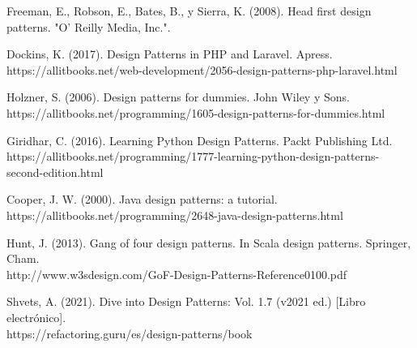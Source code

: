\documentclass{article}
\begin{document}
\begin{thebibliography}{XXX0000}
     Freeman, E., Robson, E., Bates, B., y Sierra, K. (2008). Head first design patterns. "O' Reilly Media, Inc.".

     Dockins, K. (2017). Design Patterns in PHP and Laravel. Apress. \\https://allitbooks.net/web-development/2056-design-patterns-php-laravel.html

     Holzner, S. (2006). Design patterns for dummies. John Wiley y Sons. \\https://allitbooks.net/programming/1605-design-patterns-for-dummies.html

     Giridhar, C. (2016). Learning Python Design Patterns. Packt Publishing Ltd. \\https://allitbooks.net/programming/1777-learning-python-design-patterns-second-edition.html

     Cooper, J. W. (2000). Java design patterns: a tutorial. \\https://allitbooks.net/programming/2648-java-design-patterns.html

     Hunt, J. (2013). Gang of four design patterns. In Scala design patterns. Springer, Cham. \\http://www.w3sdesign.com/GoF-Design-Patterns-Reference0100.pdf
    
     Shvets, A. (2021). Dive into Design Patterns: Vol. 1.7 (v2021 ed.) [Libro electrónico]. \\https://refactoring.guru/es/design-patterns/book

\end{thebibliography}
\end{document}
